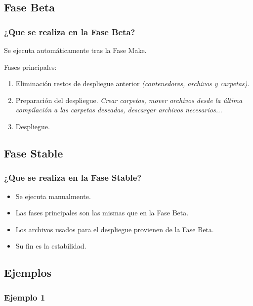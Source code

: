 \documentclass[
xcolor={svgnames},
hyperref={colorlinks,citecolor=DeepPink4,linkcolor=Black,urlcolor=DarkBlue}
]{beamer}
\begin{document}
\subsection{Fase Beta}\label{despliegue-faseBeta}

\begin{frame}
	\frametitle{¿Que se realiza en la Fase Beta?}
	Se ejecuta automáticamente tras la Fase Make.
	\vspace{0.2in}
	
	
	Fases principales:
	
	\begin{enumerate}
		\item Eliminación restos de despliegue anterior \textit{(contenedores, archivos y carpetas)}.
		\item Preparación del despliegue. \textit{Crear carpetas, mover archivos desde la última compilación a las carpetas deseadas, descargar archivos necesarios... }
		\item Despliegue.
	\end{enumerate}
\end{frame}

\subsection{Fase Stable}

\begin{frame}
	\frametitle{¿Que se realiza en la Fase Stable?}
	\begin{itemize}
		\item Se ejecuta manualmente.
		\item Las fases principales son las mismas que en la Fase Beta. %
		\item Los archivos usados para el despliegue provienen de la  Fase Beta. %
		\item Su fin es la estabilidad.
	\end{itemize}
\end{frame}

\subsection{Ejemplos}

\subsubsection{Ejemplo 1}
\end{document}
